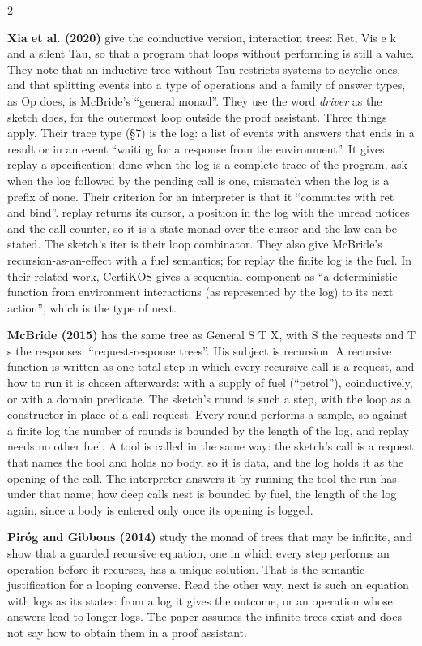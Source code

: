 \documentclass{article}
\newcommand{\paper}[1]{\par\smallskip\textbf{#1}\quad}
\newcommand{\cd}[1]{{\ttfamily #1}}
\begin{document}
\begin{multicols}{2}
\paper{Xia et al. (2020)} give the coinductive version, interaction trees: \cd{Ret}, \cd{Vis e k}
and a silent \cd{Tau}, so that a program that loops without performing is still a value. They note
that an inductive tree without \cd{Tau} restricts systems to acyclic ones, and that splitting
events into a type of operations and a family of answer types, as \cd{Op} does, is McBride's
``general monad''. They use the word \emph{driver} as the sketch does, for the outermost loop
outside the proof assistant. Three things apply. Their trace type (\S7) is the log: a list of
events with answers that ends in a result or in an event ``waiting for a response from the
environment''. It gives \cd{replay} a specification: \cd{done} when the log is a complete trace of
the program, \cd{ask} when the log followed by the pending call is one, \cd{mismatch} when the log
is a prefix of none. Their criterion for an interpreter is that it ``commutes with ret and
bind''. \cd{replay} returns its cursor, a position in the log with the unread notices and the call counter, so it is
a state monad over the cursor and the law can be stated. The sketch's \cd{iter} is their loop
combinator. They also give McBride's recursion-as-an-effect with a fuel semantics; for
\cd{replay} the finite log is the fuel. In their related work, CertiKOS gives
a sequential component as ``a deterministic function from environment interactions (as represented
by the log) to its next action'', which is the type of \cd{next}.

\paper{McBride (2015)} has the same tree as \cd{General S T X}, with \cd{S} the requests and
\cd{T s} the responses: ``request-response trees''. His subject is recursion. A recursive function
is written as one total step in which every recursive call is a request, and how to run it is
chosen afterwards: with a supply of fuel (``petrol''), coinductively, or with a domain predicate.
The sketch's \cd{round} is such a step, with the loop as a constructor in place of a call
request. Every round performs a \cd{sample}, so against a finite log the number of rounds is
bounded by the length of the log, and \cd{replay} needs no other fuel. A tool is called in
the same way: the sketch's \cd{call} is a request that names the tool and holds no body, so it
is data, and the log holds it as the opening of the call. The interpreter answers it by running
the tool the run has under that name; how deep calls nest is bounded by fuel, the length of the
log again, since a body is entered only once its opening is logged.

\paper{Pir\'og and Gibbons (2014)} study the monad of trees that may be infinite, and show that a
guarded recursive equation, one in which every step performs an operation before it recurses, has
a unique solution. That is the semantic justification for a looping \cd{converse}. Read the other
way, \cd{next} is such an equation with logs as its states: from a log it gives the outcome, or an
operation whose answers lead to longer logs. The paper assumes the infinite trees exist and does
not say how to obtain them in a proof assistant.


\end{multicols}
\end{document}
